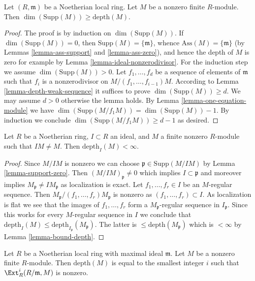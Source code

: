 \begin{lemma}
\label{lemma-bound-depth}
Let $(R, \mathfrak m)$ be a Noetherian local ring.
Let $M$ be a nonzero finite $R$-module.
Then $\dim(\text{Supp}(M)) \geq \text{depth}(M)$.
\end{lemma}

\begin{proof}
The proof is by induction on $\dim(\text{Supp}(M))$.
If $\dim(\text{Supp}(M)) = 0$, then
$\text{Supp}(M) = \{\mathfrak m\}$, whence $\text{Ass}(M) = \{\mathfrak m\}$
(by Lemmas \ref{lemma-ass-support} and \ref{lemma-ass-zero}), and hence
the depth of $M$ is zero for example by
Lemma \ref{lemma-ideal-nonzerodivisor}.
For the induction step we assume $\dim(\text{Supp}(M)) > 0$.
Let $f_1, \ldots, f_d$ be a sequence of elements of $\mathfrak m$
such that $f_i$ is a nonzerodivisor on $M/(f_1, \ldots, f_{i - 1})M$.
According to Lemma \ref{lemma-depth-weak-sequence} it suffices to prove
$\dim(\text{Supp}(M)) \geq d$. We may assume
$d > 0$ otherwise the lemma holds. By
Lemma \ref{lemma-one-equation-module}
we have $\dim(\text{Supp}(M/f_1M)) = \dim(\text{Supp}(M)) - 1$.
By induction we conclude $\dim(\text{Supp}(M/f_1M)) \geq d - 1$
as desired.
\end{proof}

\begin{lemma}
\label{lemma-depth-finite-noetherian}
Let $R$ be a Noetherian ring, $I \subset R$ an ideal, and $M$ a
finite nonzero $R$-module such that $IM \not = M$. Then
$\text{depth}_I(M) < \infty$.
\end{lemma}

\begin{proof}
Since $M/IM$ is nonzero we can choose $\mathfrak p \in \text{Supp}(M/IM)$
by Lemma \ref{lemma-support-zero}. Then $(M/IM)_\mathfrak p \not = 0$
which implies $I \subset \mathfrak p$ and moreover implies
$M_\mathfrak p \not = IM_\mathfrak p$ as localization is exact.
Let $f_1, \ldots, f_r \in I$ be an $M$-regular sequence.
Then $M_\mathfrak p/(f_1, \ldots, f_r)M_\mathfrak p$ is
nonzero as $(f_1, \ldots, f_r) \subset I$. As localization is
flat we see that the images of $f_1, \ldots, f_r$ form a
$M_\mathfrak p$-regular sequence in $I_\mathfrak p$. Since this
works for every $M$-regular sequence in $I$ we conclude that
$\text{depth}_I(M) \leq \text{depth}_{I_\mathfrak p}(M_\mathfrak p)$.
The latter is $\leq \text{depth}(M_\mathfrak p)$ which is
$< \infty$ by Lemma \ref{lemma-bound-depth}.
\end{proof}

\begin{lemma}
\label{lemma-depth-ext}
Let $R$ be a Noetherian local ring with maximal ideal $\mathfrak m$.
Let $M$ be a nonzero finite $R$-module. Then $\text{depth}(M)$
is equal to the smallest integer $i$ such that
$\Ext^i_R(R/\mathfrak m, M)$ is nonzero.
\end{lemma}

